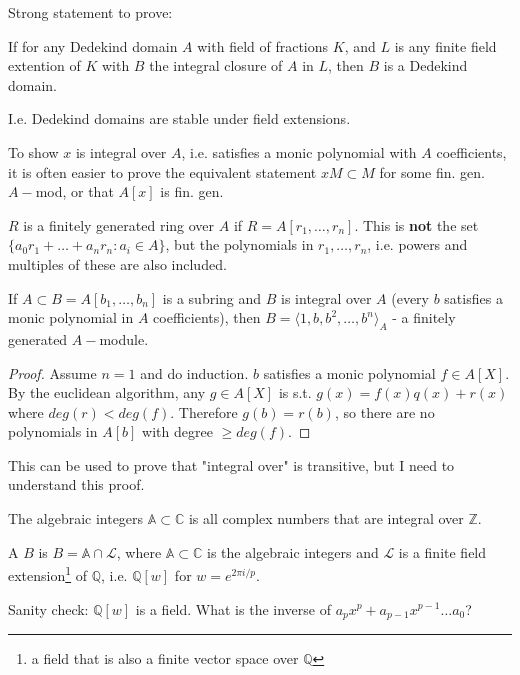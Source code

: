 Strong statement to prove: 
\begin{theorem}
If for any Dedekind domain $A$ with field of fractions $K$, and $L$ is any finite field extention of $K$ with $B$ the integral closure of $A$ in $L$, then $B$ is a Dedekind domain.
\end{theorem}

I.e. Dedekind domains are stable under field extensions.

To show $x$ is integral over $A$, i.e. satisfies a monic polynomial with $A$ coefficients, it is often easier to prove the equivalent statement $xM\subset M$ for some fin. gen. $A-$mod, or that $A[x]$ is fin. gen.

$R$ is a finitely generated ring over $A$ if $R=A[r_1,\dots,r_n]$. This is \textbf{not} the set $\{a_0r_1+\dots+a_nr_n:a_i\in A\}$, but the polynomials in $r_1,\dots,r_n$, i.e. powers and multiples of these are also included.
\begin{prop}
If $A\subset B=A[b_1,\dots,b_n]$ is a subring and $B$ is integral over $A$ (every $b$ satisfies a monic polynomial in $A$ coefficients), then $B=\langle1,b,b^2,\dots,b^n\rangle_A$ - a finitely generated $A-$module. 
\end{prop}
\begin{proof}
Assume $n=1$ and do induction. $b$ satisfies a monic polynomial $f\in A[X]$. By the euclidean algorithm, any $g\in A[X]$ is s.t. $g(x)=f(x)q(x)+r(x)$ where $deg(r)<deg(f)$. Therefore $g(b)=r(b)$, so there are no polynomials in $A[b]$ with degree $\geq deg(f)$.
\end{proof}
This can be used to prove that "integral over" is transitive, but I need to understand this proof.

\begin{definition}
The algebraic integers $\mathbb{A}\subset \mathbb{C}$ is all complex numbers that are integral over $\mathbb{Z}$.
\end{definition}

\begin{definition}
A  $B$ is $B=\mathbb{A}\cap \mathcal{L}$, where $\mathbb{A}\subset \mathbb{C}$ is the algebraic integers and $\mathcal{L}$ is a finite field extension\footnote{a field that is also a finite vector space over $\mathbb{Q}$} of $\mathbb{Q}$, i.e. $\mathbb{Q}[w]$ for $w=e^{2\pi i/p}$.
\end{definition}

Sanity check: $\mathbb{Q}[w]$ is a field. What is the inverse of $a_px^p+a_{p-1}x^{p-1}\dots a_0$?

